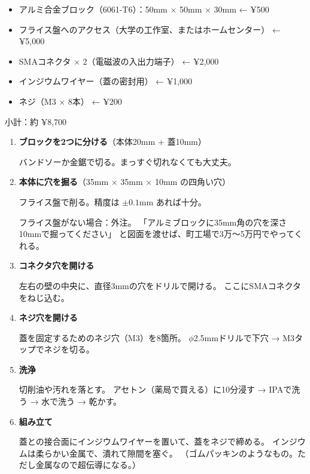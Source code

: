 \documentclass[12pt,a4paper]{article}
\begin{document}
\begin{tukurubox}[必要なもの]
\begin{itemize}
\item アルミ合金ブロック（6061-T6）：50mm $\times$ 50mm $\times$ 30mm ← ¥500
\item フライス盤へのアクセス（大学の工作室、またはホームセンター） ← ¥5,000
\item SMAコネクタ $\times$ 2（電磁波の入出力端子） ← ¥2,000
\item インジウムワイヤー（蓋の密封用） ← ¥1,000
\item ネジ（M3 $\times$ 8本） ← ¥200
\end{itemize}
小計：約 ¥8,700
\end{tukurubox}

\begin{tukurubox}[手順]
\begin{enumerate}
\item \textbf{ブロックを2つに分ける}（本体20mm + 蓋10mm）

バンドソーか金鋸で切る。まっすぐ切れなくても大丈夫。

\item \textbf{本体に穴を掘る}（35mm $\times$ 35mm $\times$ 10mm の四角い穴）

フライス盤で削る。精度は $\pm 0.1$mm あれば十分。

フライス盤がない場合：外注。
「アルミブロックに35mm角の穴を深さ10mmで掘ってください」
と図面を渡せば、町工場で3万〜5万円でやってくれる。

\item \textbf{コネクタ穴を開ける}

左右の壁の中央に、直径3mmの穴をドリルで開ける。
ここにSMAコネクタをねじ込む。

\item \textbf{ネジ穴を開ける}

蓋を固定するためのネジ穴（M3）を8箇所。
$\phi$2.5mmドリルで下穴 → M3タップでネジを切る。

\item \textbf{洗浄}

切削油や汚れを落とす。
アセトン（薬局で買える）に10分浸す → IPAで洗う → 水で洗う → 乾かす。

\item \textbf{組み立て}

蓋との接合面にインジウムワイヤーを置いて、蓋をネジで締める。
インジウムは柔らかい金属で、潰れて隙間を塞ぐ。
（ゴムパッキンのようなもの。ただし金属なので超伝導になる。）
\end{enumerate}
\end{tukurubox}
\end{document}

